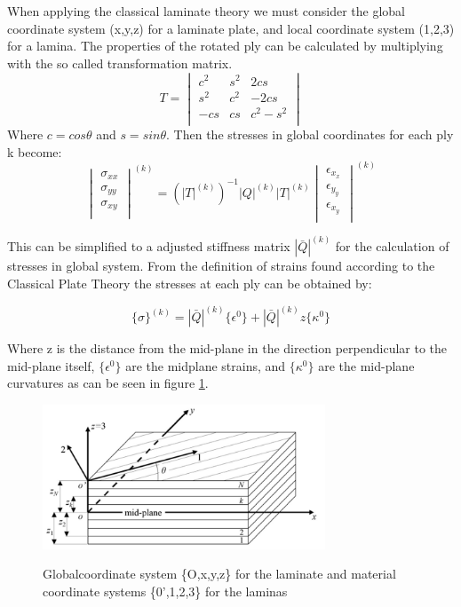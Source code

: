 When applying the classical laminate theory we must consider the global coordinate system (x,y,z) for a laminate plate, and local coordinate system (1,2,3) for a lamina. The properties of the rotated ply can be calculated by multiplying with the so called transformation matrix. 
\begin{equation}\label{Transformation matrix}
T=\begin{vmatrix}
c^2 & s^2 & 2cs\\
s^2 & c^2 & -2cs \\
-cs & cs & c^2-s^2\\
\end{vmatrix}
\end{equation}
Where $c=cos\theta$  and $s=sin\theta$. Then the stresses in global coordinates for each ply k become:
\begin{equation}\label{CLT}
\begin{vmatrix}
\sigma_{xx}\\
\sigma_{yy}\\
\sigma_{xy}\\
\end{vmatrix}^{(k)}
= (|T|^{(k)})^{-1}|Q|^{(k)}|T|^{(k)}
\begin{vmatrix}
\epsilon_x_x\\
\epsilon_y_y\\
\epsilon_x_y\\
\end{vmatrix}^{(k)}
\end{equation}

This can be simplified to a adjusted stiffness matrix $|\bar{Q}|^{(k)}$ for the calculation of stresses in global system. From the definition of strains found according to the Classical Plate Theory \cite{Ishai2006EngineeringMaterials} the stresses at each ply can be obtained by:

\begin{equation}\label{CPT}
\{\sigma\}^{(k)}=|\bar{Q}|^{(k)}\{\epsilon^0\}+|\bar{Q}|^{(k)}z\{\kappa^0\}
\end{equation}

Where z is the distance from the mid-plane in the direction perpendicular to the mid-plane itself, $\{\epsilon^0\}$ are the midplane strains, and $\{\kappa^0\}$ are the mid-plane curvatures as can be seen in figure \ref{fig:Midplane}. 

\begin{figure}[H]
    \centering
    \includegraphics[width=0.75\textwidth]{chapter_2/figures/Midplane.PNG}
    \caption{Globalcoordinate system \{O,x,y,z\} for the laminate and material coordinate systems \{0',1,2,3\} for the laminas} \cite{Alaimo2017InfluenceParts}
    \label{fig:Midplane}
\end{figure}


